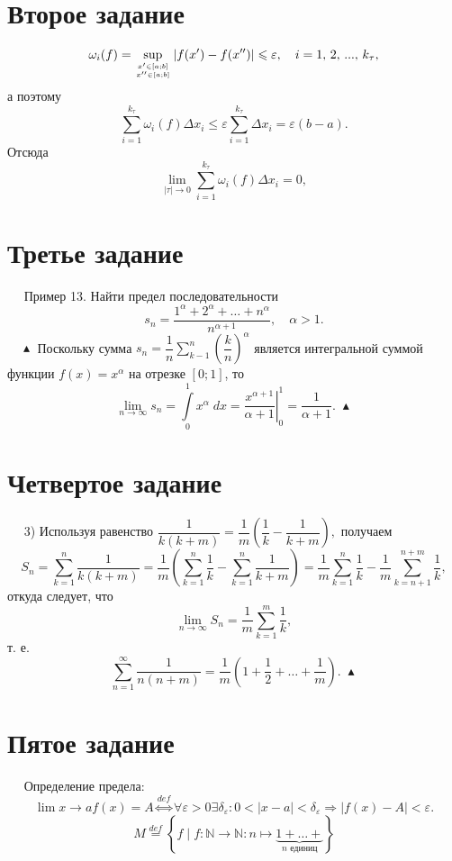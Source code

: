 \documentclass[a4paper,12pt]{article} %
\begin{document}
	\section{Второе задание}
	$$
		\omega_i(f) = \sup \limits_{x' \in \left[a ; b\right] \atop x'' \in \left[a ; b\right]} |f(x') -f(x'')| \leqslant \varepsilon, \quad
		i=1,\, 2, \, ... , \, k_\tau,
	$$
	а поэтому
	$$
		\sum \limits_{i=1}^{k_\tau} \omega_i(f) \Delta x_i \leqslant \varepsilon 
		\sum \limits_{i=1}^{k_\tau} \Delta x_i = 
		\varepsilon \left(b - a\right).
	$$
	Отсюда
	$$
		\lim \limits_{| \tau | \to 0} \sum \limits_{i=1}^{k_\tau} \omega_i(f) \Delta x_i = 0,
	$$
	
	\section{Третье задание}
	$\quad$ Пример 13. Найти предел последовательности 
	$$
		s_n = \dfrac{1^{\alpha} + 2^{\alpha} + \dots + n^{\alpha}}{n^{\alpha + 1}}, \quad \alpha > 1.
	$$
	$\quad \blacktriangle$ Поскольку сумма $s_n \! = \dfrac{1}{n} \displaystyle \sum \limits_{k-1}^n \left( \dfrac{k}{n} \right)^ \alpha$ является интегральной суммой функции
	$f(x) = x^{\alpha}$ на отрезке $\left[0; 1\right]$, то
	$$
		\lim \limits_{n \to \infty} s_n = 
		\int \limits_0^1 x^{\alpha} \; dx = 
		\left. \dfrac{x^{\alpha + 1}}{\alpha + 1} \right|_0^1 =
		\dfrac{1}{\alpha + 1}. \; \blacktriangle
	$$
	
	\section{Четвертое задание}
	$\quad$ 3) Используя равенство
	$
		\dfrac{1}{k \left(k + m\right)} = \dfrac{1}{m}
		\left( \dfrac{1}{k} - \dfrac{1}{k + m} \right) \! ,
	$
	получаем
	$$
		S_n = \sum \limits_{k = 1}^n \dfrac{1}{k \left(k + m\right)} = 
		\dfrac{1}{m} \left( \sum \limits_{k=1}^n \dfrac{1}{k} - \sum \limits_{k=1}^n \dfrac{1}{k + m} \right) = 
		\dfrac{1}{m} \sum \limits_{k = 1}^n \dfrac{1}{k} -
		\dfrac{1}{m} \sum \limits_{k = n + 1}^{n + m} \dfrac{1}{k},
	$$
	откуда следует, что
	$$
		\lim \limits_{n \to \infty} S_n = \dfrac{1}{m} \sum \limits_{k=1}^m \dfrac{1}{k},
	$$
	т. е.
	$$
		\sum \limits_{n = 1}^{\infty} \dfrac{1}{n \left(n + m\right)} =
		\dfrac{1}{m} \left(1 + \dfrac{1}{2} + \dots + \dfrac{1}{m} \right) \! . \; \blacktriangle
	$$
	
	\section{Пятое задание}
	$\quad$ Определение предела:
	$$
		\lim \limits{x \to a} f(x) = A \stackrel{def}{\Longleftrightarrow}
		\forall \varepsilon > 0 \exists \delta_{\varepsilon} : 
		0 < |x - a| < \delta_{\varepsilon} \Longrightarrow 
		| f(x) - A | < \varepsilon.
	$$
	$$
		M \stackrel{def}{=} \left\{ f \mid f : \mathbb{N} \to \mathbb{N} : n \longmapsto \underbrace{1 + \dots + }_{n \text{ единиц}} \right\}
	$$
\end{document}
